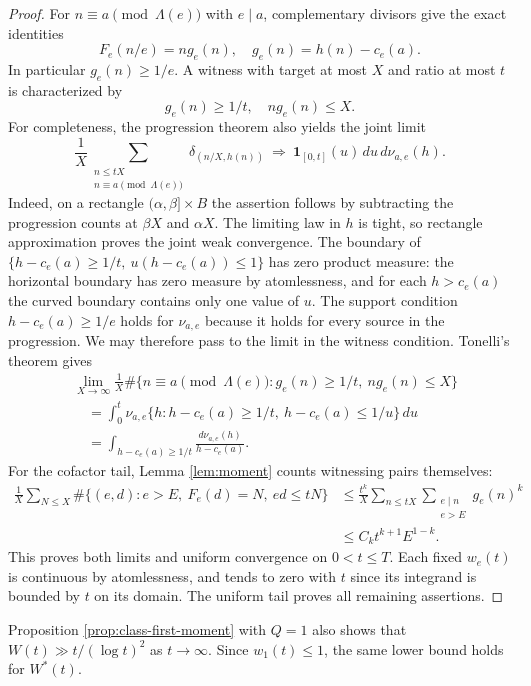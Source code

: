\documentclass[11pt,letterpaper,reqno]{amsart}
\numberwithin{equation}{section}
\theoremstyle{remark}
\newcommand{\1}{\mathbf 1}
\renewcommand{\leq}{\leqslant}
\renewcommand{\geq}{\geqslant}
\begin{document}
\begin{proof}
For $n\equiv a\pmod{\Lambda(e)}$ with $e\mid a$, complementary divisors
give the exact identities
\[
 F_e(n/e)=n g_e(n),
 \quad
 g_e(n)=h(n)-c_e(a).
\]
In particular $g_e(n)\geq1/e$. A witness with target at most $X$
and ratio at most $t$ is characterized by
\[
 g_e(n)\geq1/t,
 \quad n g_e(n)\leq X.
\]
For completeness, the progression theorem also yields the joint limit
\[
 \frac1X\sum_{\substack{n\leq tX\\n\equiv a\pmod{\Lambda(e)}}}
 \delta_{(n/X,h(n))}
 \ \Longrightarrow\
 \boldsymbol1_{[0,t]}(u)\,du\,d\nu_{a,e}(h).
\]
Indeed, on a rectangle $(\alpha,\beta]\times B$ the assertion follows
by subtracting the progression counts at $\beta X$ and $\alpha X$.
The limiting law in $h$ is tight, so rectangle approximation proves
the joint weak convergence. The boundary of
$\{h-c_e(a)\geq1/t,\ u(h-c_e(a))\leq1\}$ has zero product measure:
the horizontal boundary has zero measure by atomlessness, and for each
$h>c_e(a)$ the curved boundary contains only one value of $u$.
The support condition $h-c_e(a)\geq1/e$ holds for $\nu_{a,e}$ because
it holds for every source in the progression. We may therefore pass to
the limit in the witness condition. Tonelli's theorem gives
\begin{align*}
 &\lim_{X\to\infty}\frac1X
 \#\{n\equiv a\pmod{\Lambda(e)}:
 g_e(n)\geq1/t,\ n g_e(n)\leq X\}\\
 &\quad=
 \int_0^t\nu_{a,e}
 \{h:h-c_e(a)\geq1/t,\ h-c_e(a)\leq1/u\}\,du\\
 &\quad=
 \int_{h-c_e(a)\geq1/t}
 \frac{d\nu_{a,e}(h)}{h-c_e(a)}.
\end{align*}
For the cofactor tail, Lemma \ref{lem:moment}
counts witnessing pairs themselves:
\begin{align*}
 \frac1X\sum_{N\leq X}
 \#\{(e,d):e>E,\ F_e(d)=N,\ ed\leq tN\}
 &\leq\frac{t^k}{X}
 \sum_{n\leq tX}\sum_{\substack{e\mid n\\e>E}}g_e(n)^k
 \nonumber\\
 &\leq C_kt^{k+1}E^{1-k}.
\end{align*}
This proves both limits and uniform convergence on $0<t\leq T$.
Each fixed $w_e(t)$ is continuous by atomlessness, and tends to
zero with $t$ since its integrand is bounded by $t$ on its domain.
The uniform tail proves all remaining assertions.
\end{proof}

Proposition \ref{prop:class-first-moment} with $Q=1$ also shows that
$W(t)\gg t/(\log t)^2$ as $t\to\infty$. Since $w_1(t)\leq1$,
the same lower bound holds for $W^*(t)$.
\end{document}
